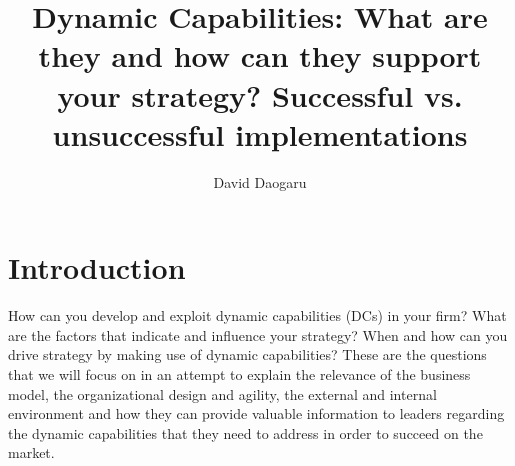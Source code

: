 \documentclass[11pt]{article}
\title{\textbf{Dynamic Capabilities: What are they and how can they support your strategy?} \newline Successful vs. unsuccessful implementations}
\date{}
\begin{document}
\author{David Daogaru}
\maketitle

\section{Introduction}
How can you develop and exploit dynamic capabilities (DCs) in your firm? What are the factors that indicate and influence your strategy? When and how can you drive strategy by making use of dynamic capabilities? These are the questions that we will focus on in an attempt to explain the relevance of the business model, the organizational design and agility, the external and internal environment and how they can provide valuable information to leaders regarding the dynamic capabilities that they need to address in order to succeed on the market.
\end{document}
